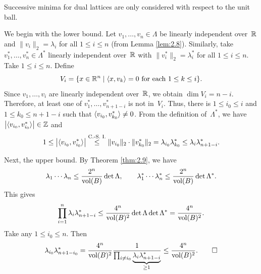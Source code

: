 \documentclass{Vorlesungstemplate_English} %
\begin{document}
\noindent Successive minima for dual lattices are only considered with respect to the unit ball.

\begin{pf}
    We begin with the lower bound.
    Let \(v_1, \dots, v_n \in \Lambda\) be linearly independent over~\(\mathbb{R}\) and \(\|v_i\|_2 = \lambda_i\) for all \(1 \le i \le n\) (from Lemma \ref{lem:2.8}).
    Similarly, take \(v_1^*, \dots, v_n^* \in \Lambda^*\) linearly independent over~\(\mathbb{R}\) with \(\|v_i^*\|_2 = \lambda_i^*\) for all \(1 \le i \le n\).
    Take \(1 \le i \le n\).
    Define
    \begin{equation*}
        V_i
        = \{x \in \mathbb{R}^n \mid \langle x, v_k\rangle = 0 \text{ for each } 1 \le k \le i\}.
    \end{equation*}
    Since \(v_1, \dots, v_i\) are linearly independent over~\(\mathbb{R}\), we obtain \(\dim V_i = n-i\).
    Therefore, at least one of \(v_1^*, \dots, v_{n+1-i}^*\) is not in~\(V_i\).
    Thus, there is \(1 \le i_0 \le i\) and \(1 \le k_0 \le n+1-i\) such that \(\langle v_{i_0}, v_{k_0}^*\rangle \ne 0\).
    From the definition of~\(\Lambda^*\), we have \(\left| \langle v_{i_0}, v_{i_0}^*\rangle\right| \in \mathbb{Z}\) and
    \begin{equation*}
        1
        \le \left| \langle v_{i_0}, v_{i_0}^*\rangle\right|
        \stackrel{\text{C.-S. I.}}{\le} \|v_{i_0}\|_2 \cdot \|v_{k_0}^*\|_2
        = \lambda_{i_0} \lambda_{k_0}^*
        \leq \lambda_i \lambda_{n+1-i}^*.
    \end{equation*}

    Next, the upper bound.
    By Theorem \ref{thm:2.9}, we have
    \begin{equation*}
        \lambda_1 \dotsm \lambda_n
        \le \frac{2^n}{\text{vol}(B)} \det \Lambda, \qquad
        \lambda_1^* \dotsm \lambda_n^*
        \le \frac{2^n}{\text{vol}(B)} \det \Lambda^*.
    \end{equation*}
    This gives
    \begin{equation*}
        \prod_{i=1}^n \lambda_i \lambda_{n+1-i}^*
        \leq \frac{4^n}{\text{vol}(B)^2} \det \Lambda \det \Lambda^*
        = \frac{4^n}{\text{vol}(B)^2}.
    \end{equation*}
    Take any \(1 \le i_0 \le n\).
    Then
    \begin{equation*}
        \lambda_{i_0} \lambda_{n+1-i_0}^*
        = \frac{4^n}{\text{vol}(B)^2} \frac{1}{\prod_{i \ne i_0} \underbrace{\lambda_i \lambda_{n+1-i}^*}_{\ge 1}}
        \le \frac{4^n}{\text{vol}(B)^2}. \qedhere
    \end{equation*}
\end{pf}
\end{document}
